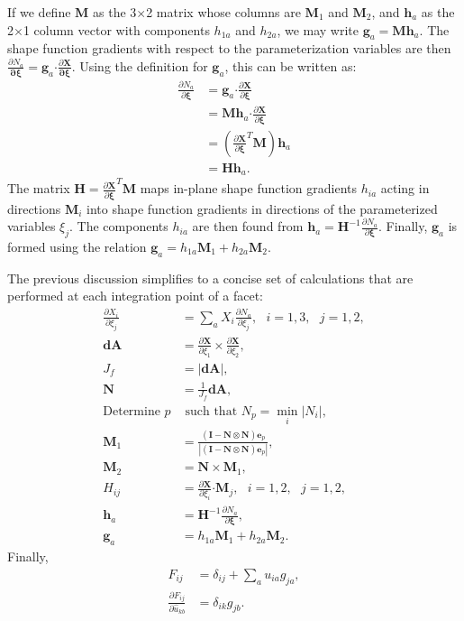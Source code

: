 If we define ${\bm {M}}$ as the 3$\times$2 matrix whose columns are ${\bm {M}}_1$ and ${\bm M}_2$, and $\bm{h}_a$ as the 2$\times$1 column vector with components $h_{1a}$ and $h_{2a}$, we may write ${\bm g}_a = {\bm M}{\bm h}_a$. The shape function gradients with respect to the parameterization variables are then \mbox{$\frac{\partial N_a}{\bm{\partial {\xi}}} = {\bm g}_a \bm{\cdot} \frac{\partial {\bm X}}{\bm{\partial {\xi}}}$}. Using the definition for ${\bm g}_a$, this can be written as:
\begin{align}
\frac{\partial N_a}{\partial {\bm \xi}} &= {\bm g}_a \bm{\cdot} \frac{\partial {\bm X}}{\partial {\bm \xi}} \\
&= {\bm M}{\bm h}_a \bm{\cdot} \frac{\partial {\bm X}}{\partial {\bm \xi}} \\
&= (\frac{\partial {\bm X}}{\partial {\bm \xi}}^T{\bm M}){\bm h}_a \\
&= {\bm H}{\bm h}_a.
\end{align}
The matrix ${\bm H} = \frac{\partial {\bm X}}{\partial {\bm \xi}}^T{\bm M}$ maps in-plane shape function gradients $h_{ia}$ acting in directions ${\bm M}_i$ into shape function gradients in directions of the parameterized variables ${\xi_j}$. The components $h_{ia}$ are then found from ${\bm h}_a = {\bm H}^{-1}\frac{\partial N_a}{\partial {\bm \xi}}$. Finally, ${\bm g}_a$ is formed using the relation ${\bm g}_a = {h_{1a}}{\bm M}_1 + {h_{2a}}{\bm M}_2$.

The previous discussion simplifies to a concise set of calculations that are performed at each integration point of a facet:
\begin{align}
\frac{\partial X_{i}}{\partial \xi_j} &= \sum_a X_{i}\frac{\partial N_a}{\partial \xi_j}, \text{\ \ \ \ }i=1,3, \text{\ \ }j = 1,2, \\
{\bm{dA}} &= \frac{\partial{\bm{X}}}{\partial \xi_1} \times \frac{\partial {\bm {X}}}{\partial \xi_2}, \\
J_f &= | {\bm {dA}}|, \\
{\bm N} &= \frac{1}{J_f}{\bm {dA}}, \\
\text{Determine } p &\text{ such that } N_p = \min_i{|N_i|}, \\
{\bm M}_1 &=\frac{ ({\bm I} - {\bm N}\otimes{\bm N}){\bm e}_p}{|({\bm I} - {\bm N}\otimes{\bm N}){\bm e}_p|}, \\
{\bm M}_2 &= {\bm N} \times {\bm M}_1, \\
H_{ij} &= \frac{\partial {\bm X}}{\partial \xi_i} \bm{\cdot} {\bm M}_j, \text{\ \ \ \ }i=1,\text{2}, \text{\ \ }j = 1,\text{2}, \\
{\bm h}_a &= {\bm H}^{-1} \frac{\partial N_a}{\partial {\bm \xi}}, \\
{\bm g}_a &= h_{1a}{\bm M}_1 + h_{2a}{\bm M}_2.
\end{align}
Finally,
\begin{align}
F_{ij} &= \delta_{ij} + \sum_a{u_{ia}g_{ja}}, \\
\frac{\partial F_{ij}}{\partial \hat{u}_{kb}} &= \delta_{ik}g_{jb}.
\end{align}

